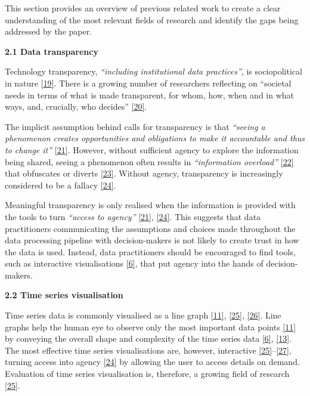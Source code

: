 \documentclass{article}
\begin{document}
This section provides an overview of previous related work to create a
clear understanding of the most relevant fields of research and identify
the gaps being addressed by the paper.

\textbf{2.1 Data transparency}

Technology transparency, \emph{``including institutional data
practices''}, is sociopolitical in nature
\protect\hyperlink{ref-political_transparency}{{[}19{]}}. There is a
growing number of researchers reflecting on ``societal needs in terms of
what is made transparent, for whom, how, when and in what ways, and,
crucially, who decides''
\protect\hyperlink{ref-social_transparency}{{[}20{]}}.

The implicit assumption behind calls for transparency is that
\emph{``seeing a phenomenon creates opportunities and obligations to
make it accountable and thus to change it''}
\protect\hyperlink{ref-transparency_lack}{{[}21{]}}. However, without
sufficient agency to explore the information being shared, seeing a
phenomenon often results in \emph{``information overload''}
\protect\hyperlink{ref-digital_transparency}{{[}22{]}} that obfuscates
or diverts \protect\hyperlink{ref-transparency_obfuscation}{{[}23{]}}.
Without agency, transparency is increasingly considered to be a fallacy
\protect\hyperlink{ref-transparency_fallacy}{{[}24{]}}.

Meaningful transparency is only realised when the information is
provided with the tools to turn \emph{``access to agency''}
\protect\hyperlink{ref-transparency_lack}{{[}21{]}},
\protect\hyperlink{ref-transparency_fallacy}{{[}24{]}}. This suggests
that data practitioners communicating the assumptions and choices made
throughout the data processing pipeline with decision-makers is not
likely to create trust in how the data is used. Instead, data
practitioners should be encouraged to find tools, such as interactive
visualisations \protect\hyperlink{ref-datapoint}{{[}6{]}}, that put
agency into the hands of decision-makers.

\textbf{2.2 Time series visualisation}

Time series data is commonly visualised as a line graph
\protect\hyperlink{ref-Sveinn}{{[}11{]}},
\protect\hyperlink{ref-timenotes}{{[}25{]}},
\protect\hyperlink{ref-timetuner}{{[}26{]}}. Line graphs help the human
eye to observe only the most important data points
\protect\hyperlink{ref-Sveinn}{{[}11{]}} by conveying the overall shape
and complexity of the time series data
\protect\hyperlink{ref-datapoint}{{[}6{]}},
\protect\hyperlink{ref-downsampling}{{[}13{]}}. The most effective time
series visualisations are, however, interactive
\protect\hyperlink{ref-timenotes}{{[}25{]}}--\protect\hyperlink{ref-plotly}{{[}27{]}},
turning access into agency
\protect\hyperlink{ref-transparency_fallacy}{{[}24{]}} by allowing the
user to access details on demand. Evaluation of time series
visualisation is, therefore, a growing field of research
\protect\hyperlink{ref-timenotes}{{[}25{]}}.
\end{document}
